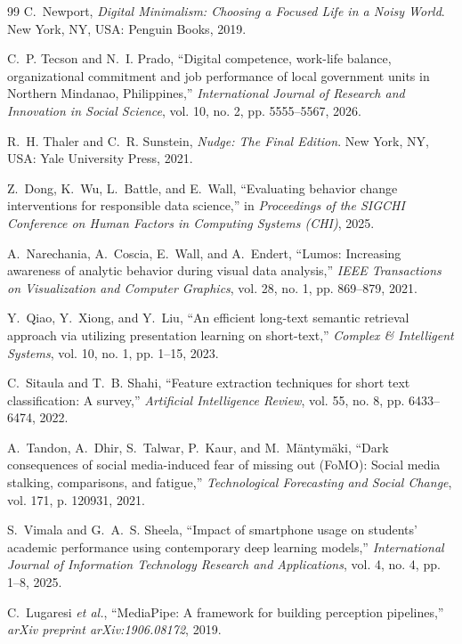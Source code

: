 \documentclass[conference]{IEEEtran}
\begin{document}
\begin{thebibliography}{99}
C.~Newport, \emph{Digital Minimalism: Choosing a Focused Life in a Noisy World}. New York, NY, USA: Penguin Books, 2019.

C.~P. Tecson and N.~I. Prado, ``Digital competence, work-life balance, organizational commitment and job performance of local government units in Northern Mindanao, Philippines,'' \emph{International Journal of Research and Innovation in Social Science}, vol. 10, no. 2, pp. 5555--5567, 2026.

R.~H. Thaler and C.~R. Sunstein, \emph{Nudge: The Final Edition}. New York, NY, USA: Yale University Press, 2021.

Z.~Dong, K.~Wu, L.~Battle, and E.~Wall, ``Evaluating behavior change interventions for responsible data science,'' in \emph{Proceedings of the SIGCHI Conference on Human Factors in Computing Systems (CHI)}, 2025.

A.~Narechania, A.~Coscia, E.~Wall, and A.~Endert, ``Lumos: Increasing awareness of analytic behavior during visual data analysis,'' \emph{IEEE Transactions on Visualization and Computer Graphics}, vol. 28, no. 1, pp. 869--879, 2021.

Y.~Qiao, Y.~Xiong, and Y.~Liu, ``An efficient long-text semantic retrieval approach via utilizing presentation learning on short-text,'' \emph{Complex \& Intelligent Systems}, vol. 10, no. 1, pp. 1--15, 2023.

C.~Sitaula and T.~B. Shahi, ``Feature extraction techniques for short text classification: A survey,'' \emph{Artificial Intelligence Review}, vol. 55, no. 8, pp. 6433--6474, 2022.

A.~Tandon, A.~Dhir, S.~Talwar, P.~Kaur, and M.~Mäntymäki, ``Dark consequences of social media-induced fear of missing out (FoMO): Social media stalking, comparisons, and fatigue,'' \emph{Technological Forecasting and Social Change}, vol. 171, p. 120931, 2021.

S.~Vimala and G.~A.~S. Sheela, ``Impact of smartphone usage on students' academic performance using contemporary deep learning models,'' \emph{International Journal of Information Technology Research and Applications}, vol. 4, no. 4, pp. 1--8, 2025.

C.~Lugaresi \emph{et al.}, ``MediaPipe: A framework for building perception pipelines,'' \emph{arXiv preprint arXiv:1906.08172}, 2019.


\end{thebibliography}
\end{document}
